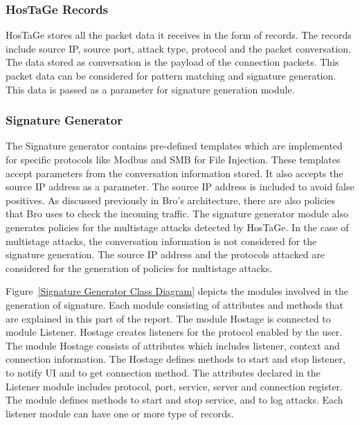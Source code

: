 \documentclass[article,msc=informatik,type=msc,colorback,accentcolor=tud9c]{tudthesis}
\begin{document}
		\vspace{5mm} 
		\subsubsection{HosTaGe Records}\label{HosTaGe Records}
		HosTaGe stores all the packet data it receives in the form of records. The records include source \ac{IP}, source port, attack type, protocol and the packet conversation. The data stored as conversation is the payload of the connection packets. This packet data can be considered for pattern matching and signature generation. This data is passed as a parameter for signature generation module. 
		
		
		 
		\vspace{5mm} 
		\subsubsection{Signature Generator}\label{Signature Generator}
		The Signature generator contains pre-defined templates which are implemented for specific protocols like Modbus and \ac{SMB} for File Injection. These templates accept parameters from the conversation information stored. It also accepts the source \ac{IP} address as a parameter. The source \ac{IP} address is included to avoid false positives. As discussed previously in Bro's architecture, there are also policies that Bro uses to check the incoming traffic. The signature generator module also generates policies for the multistage attacks detected by HosTaGe. In the case of multistage attacks, the conversation information is not considered for the signature generation. The source \ac{IP} address and the protocols attacked are considered for the generation of policies for multistage attacks.
				
		\vspace{3mm}
		Figure~\ref{Signature Generator Class Diagram} depicts the modules involved in the generation of signature. Each module consisting of attributes and methods that are explained in this part of the report.
		The module Hostage is connected to module Listener. Hostage creates listeners for the protocol enabled by the user. The module Hostage consists of attributes which includes listener, context and connection information. The Hostage defines methods to start and stop listener, to notify UI and to get connection method. The attributes declared in the Listener module includes protocol, port, service, server and connection register. The module defines methods to start and stop service, and to log attacks. Each listener module can have one or more type of records. 
		
\end{document}
